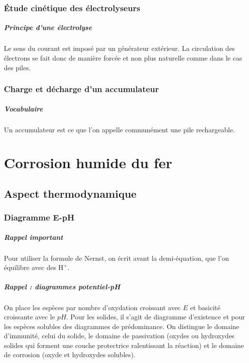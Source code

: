\documentclass[french]{book}
\theoremstyle{plain}
\theoremstyle{definition}
\theoremstyle{remark}
\begin{document}
\subsection{Étude cinétique des électrolyseurs}

\paragraph{Principe d'une électrolyse} Le sens du courant est imposé par un générateur extérieur. La circulation des électrons se fait donc de manière forcée et non plus naturelle comme dans le cas des piles.

\subsection{Charge et décharge d'un accumulateur}

\paragraph{Vocabulaire} Un accumulateur est ce que l'on appelle communément une pile rechargeable.



\chapter{Corrosion humide du fer}
\localtableofcontents

\section{Aspect thermodynamique}

\subsection{Diagramme E-pH}

\paragraph{Rappel important} Pour utiliser la formule de Nernst, on écrit avant la demi-équation, que l'on équilibre avec des $\text{H}^+$.

\paragraph{Rappel : diagrammes potentiel-pH} On place les espèces par nombre d’oxydation croissant avec $E$ et basicité croissante avec le $pH$. Pour les solides, il s’agit de diagramme d’existence et pour les espèces solubles des diagrammes de prédominance. On distingue le domaine d’immunité, celui du solide, le domaine de passivation (oxydes ou hydroxydes solides qui forment une couche protectrice ralentissant la réaction) et le domaine de corrosion (oxyde et hydroxydes solubles).
\end{document}
